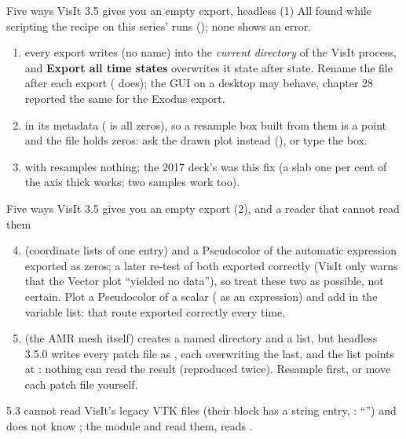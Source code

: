 \documentclass[aspectratio=169,11pt]{beamer}
\newcommand{\gui}[1]{\textsf{\textbf{#1}}}
\begin{document}
\begin{frame}{Five ways VisIt 3.5 gives you an empty export, headless (1)}
\label{fr:empty}
\footnotesize All found while scripting the recipe on this series' runs (); none shows an error.
\begin{enumerate}
  \item {} every export writes  (no name) into the \emph{current directory} of the VisIt process, and \gui{Export all time states} overwrites it state after state. Rename the file after each export ( does); the GUI on a desktop may behave, chapter 28 reported the same for the Exodus export.
  \item {} in its metadata ( is all zeros), so a resample box built from them is a point and the file holds zeros: ask the drawn plot instead (), or type the box.
  \item {}  with  resamples nothing; the 2017 deck's  was this fix (a slab one per cent of the axis thick works; two samples work too).
\end{enumerate}
\end{frame}

\begin{frame}{Five ways VisIt 3.5 gives you an empty export (2), and a reader that cannot read them}
\label{fr:empty2}
\footnotesize
\begin{enumerate}
\setcounter{enumi}{3}
  \item {} (coordinate lists of one entry) and a Pseudocolor of the automatic  expression exported  as zeros; a later re-test of both exported correctly (VisIt only warns that the Vector plot ``yielded no data''), so treat these two as possible, not certain. Plot a Pseudocolor of a scalar ( as an expression) and add  in the variable list: that route exported correctly every time.
  \item {} (the AMR mesh itself) creates a named directory and a  list, but headless 3.5.0 writes every patch file as , each overwriting the last, and the list points at : nothing can read the result (reproduced twice). Resample first, or move each patch file yourself.
\end{enumerate}
\begin{punchbox}
\scriptsize {} 5.3 cannot read VisIt's legacy VTK files (their  block has a string entry, : ``'') and does not know ; the  module and  read them,  reads .
\end{punchbox}
\end{frame}
\end{document}
